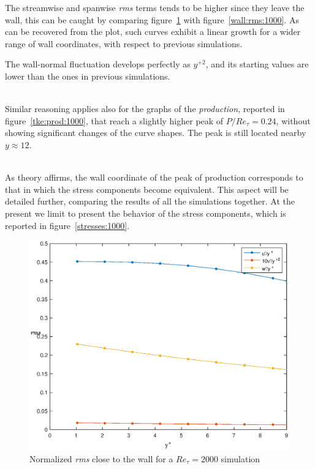 The streamwise and spanwise \emph{rms} terms tends to be higher since they leave the wall, this can be caught by comparing figure~\ref{wall:rms:2000} with figure~\ref{wall:rms:1000}. As can be recovered from the plot, such curves exhibit a linear growth for a wider range of wall coordinates, with respect to previous simulations. \par
The wall-normal fluctuation develops perfectly as $y^{+2}$, and its starting values are lower than the ones in previous simulations.\\~\par


Similar reasoning applies also for the graphs of the \emph{production}, reported in figure~\ref{tke:prod:1000}, that reach a slightly higher peak of $P/Re_{\tau}=0.24$, without showing significant changes of the curve shapes. The peak is still located nearby $y\approx 12$.\\~\par

As theory affirms, the wall coordinate of the peak of production corresponds to that in which the stress components become equivalent. This aspect will be detailed further, comparing the results of all the simulations together.
At the present we limit to present the behavior of the stress components, which is reported in figure~\ref{stresses:1000}.

\begin{figure}
\begin{center}
\includegraphics[scale=0.55]{grafici/wall_rms_2000.eps}
\caption{Normalized \emph{rms} close to the wall for a $Re_{\tau}=2000$ simulation}
\label{wall:rms:2000}
\end{center} 
\end{figure}

